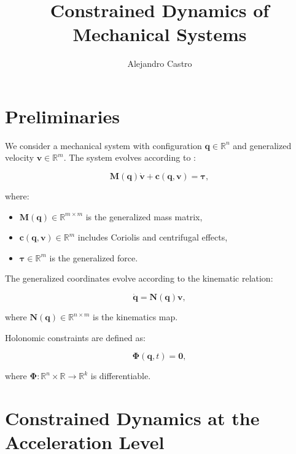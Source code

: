 \documentclass{article}
\title{Constrained Dynamics of Mechanical Systems}
\author{Alejandro Castro}
\date{}
\begin{document}
\maketitle

\section{Preliminaries}

We consider a mechanical system with configuration \( \bm{q} \in \mathbb{R}^n \)
and generalized velocity \( \bm{v} \in \mathbb{R}^m \). The system evolves
according to
\cite{bib:featherstone2008_rigid_body_dynamics_algorithms,bib:jain2010_robot_multibody_dynamics}:

\begin{equation}
    \bm{M}(\bm{q}) \dot{\bm{v}} + \bm{c}(\bm{q}, \bm{v}) = \bm{\tau},
\end{equation}

where:
\begin{itemize}
    \item \( \bm{M}(\bm{q}) \in \mathbb{R}^{m \times m} \) is the generalized
    mass matrix,
    \item \( \bm{c}(\bm{q}, \bm{v}) \in \mathbb{R}^m \) includes Coriolis and
    centrifugal effects,
    \item \( \bm{\tau} \in \mathbb{R}^m \) is the generalized force.
\end{itemize}

The generalized coordinates evolve according to the kinematic relation:

\begin{equation}
    \dot{\bm{q}} = \bm{N}(\bm{q}) \bm{v},
\end{equation}

where \( \bm{N}(\bm{q}) \in \mathbb{R}^{n \times m} \) is the kinematics map.

Holonomic constraints are defined as:

\begin{equation}
    \bm{\Phi}(\bm{q}, t) = \bm{0},
\end{equation}

where \( \bm{\Phi}: \mathbb{R}^n \times \mathbb{R} \rightarrow \mathbb{R}^k \)
is differentiable.

\section{Constrained Dynamics at the Acceleration Level}
\end{document}
